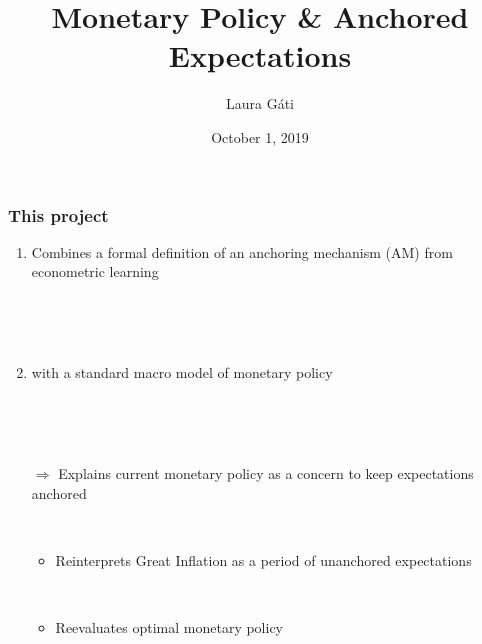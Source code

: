 \documentclass{beamer}
\author[]{Laura G\'ati}
\institute[]{Boston College}
\title[]{Monetary Policy \& Anchored Expectations}
\date[]{October 1, 2019}
\def \myFigPath {../../figures/}
\def\myPointFourteenFigScale{0.14}
\begin{document}
\begin{frame}

\maketitle


\end{frame}


\begin{frame}
	\frametitle{}

\begin{figure}[h!]
\end{figure}


\end{frame}


\begin{frame}
	\frametitle{This project}
	
	\begin{enumerate}
	\item Combines a formal definition of an anchoring mechanism (AM) from econometric learning 
	
	\
	
	\
	
	\item with a standard macro model of monetary policy
	
	\
	
	\
	
	\item[$\Rightarrow$]  Explains current monetary policy as a concern to keep expectations anchored
	
	\
	
	\begin{itemize}
	\item Reinterprets Great Inflation as a period of unanchored expectations
	
	\
	
	\item Reevaluates optimal monetary policy
	\end{itemize}

	
	\
	
	\end{enumerate}


\end{frame}
\end{document}

